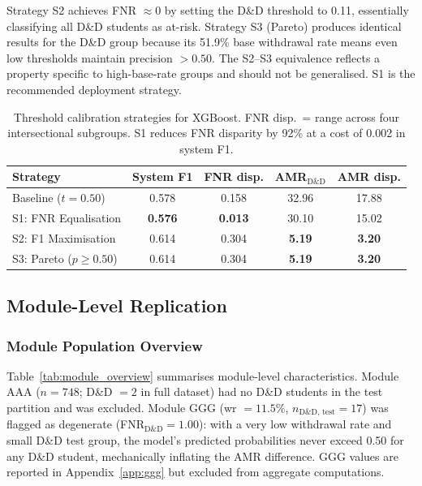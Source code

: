 \documentclass[12pt,a4paper]{article}
\begin{document}
Strategy S2 achieves FNR $\approx 0$ by setting the D\&D threshold to 0.11,
essentially classifying all D\&D students as at-risk. Strategy S3 (Pareto)
produces identical results for the D\&D group because its 51.9\% base
withdrawal rate means even low thresholds maintain precision $> 0.50$. The
S2--S3 equivalence reflects a property specific to high-base-rate groups and
should not be generalised. S1 is the recommended deployment strategy.

\begin{table}[ht]
\centering
\caption{Threshold calibration strategies for XGBoost. FNR disp.\ = range
across four intersectional subgroups. S1 reduces FNR disparity by 92\% at a
cost of 0.002 in system F1.}
\label{tab:calibration}
\small
\begin{tabular}{lcccc}
\toprule
Strategy & System F1 & FNR disp. & AMR$_{\text{D\&D}}$ & AMR disp. \\
\midrule
Baseline ($t = 0.50$)      & 0.578 & 0.158 & 32.96 & 17.88 \\
S1: FNR Equalisation       & \textbf{0.576} & \textbf{0.013} & 30.10 & 15.02 \\
S2: F1 Maximisation        & 0.614 & 0.304 & \textbf{5.19} & \textbf{3.20} \\
S3: Pareto ($p \geq 0.50$) & 0.614 & 0.304 & \textbf{5.19} & \textbf{3.20} \\
\bottomrule
\end{tabular}
\end{table}

\subsection{Module-Level Replication}
\label{sec:module_results}

\subsubsection{Module Population Overview}

Table~\ref{tab:module_overview} summarises module-level characteristics.
Module AAA ($n = 748$; D\&D $= 2$ in full dataset) had no D\&D students in
the test partition and was excluded. Module GGG (wr $= 11.5\%$,
$n_{\text{D\&D, test}} = 17$) was flagged as degenerate
(FNR$_{\text{D\&D}} = 1.00$): with a very low withdrawal rate and small D\&D
test group, the model's predicted probabilities never exceed 0.50 for any D\&D
student, mechanically inflating the AMR difference. GGG values are reported
in Appendix~\ref{app:ggg} but excluded from aggregate computations.
\end{document}
